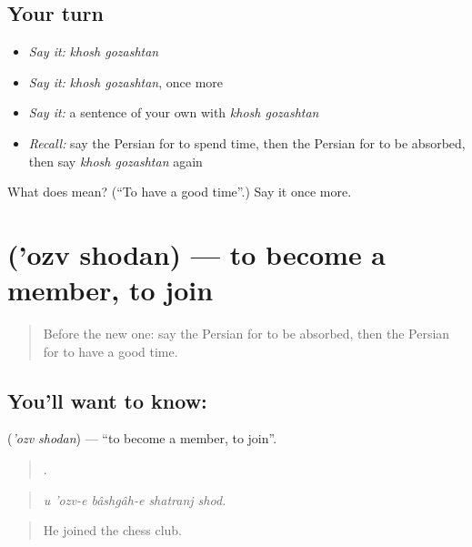 \subsection*{Your turn}
\begin{itemize}
\raggedright
  \item \emph{Say it:} \emph{khosh gozashtan}
  \item \emph{Say it:} \emph{khosh gozashtan}, once more
  \item \emph{Say it:} a sentence of your own with \emph{khosh gozashtan}
  \item \emph{Recall:} say the Persian for to spend time, then the Persian for to be absorbed, then say \emph{khosh gozashtan} again
\end{itemize}

\begin{tcolorbox}[breakable,colback=teal!4,colframe=teal!35!black,title={Before you move on}]
What does   mean? (\textquotedblleft{}To have a good time\textquotedblright{}.) Say it once more.
\end{tcolorbox}
\section[\texorpdfstring{\fa{عضو} \fa{شدن} ('ozv shodan)}{عضو شدن ('ozv shodan)}]{  ('ozv shodan) — to become a member, to join}

\label{lesson:FA-C510-ozv-shodan}



\begin{quote}
Before the new one: say the Persian for to be absorbed, then the Persian for to have a good time.
\end{quote}

\subsection*{You'll want to know:  }
\textbf{ } (\emph{'ozv shodan}) — \textquotedblleft{}to become a member, to join\textquotedblright{}.

\begin{quote}
    .
\end{quote}

\begin{quote}
\emph{u 'ozv-e bâshgâh-e shatranj shod.}
\end{quote}

\begin{quote}
He joined the chess club.
\end{quote}

